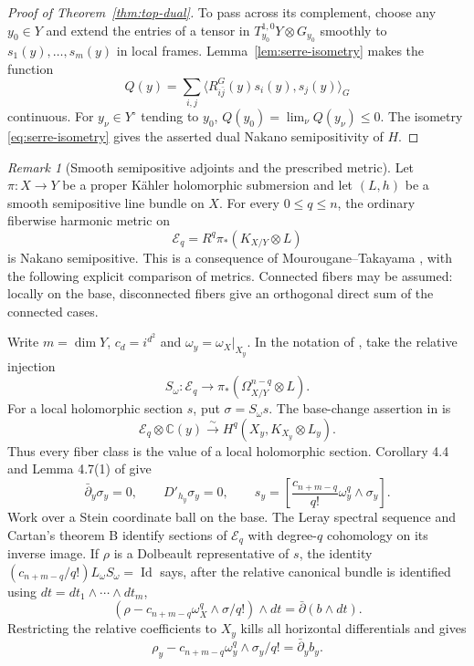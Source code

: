 \documentclass[11pt,reqno]{amsart}
\numberwithin{equation}{section}
\theoremstyle{definition}
\theoremstyle{remark}
\newtheorem{remark}[theorem]{Remark}
\newcommand{\Id}{\operatorname{Id}}
\begin{document}
\begin{proof}[Proof of Theorem~\ref{thm:top-dual}]
To pass across its complement, choose any $y_0\in Y$ and extend
the entries of a tensor in $T_{y_0}^{1,0}Y\otimes G_{y_0}$ smoothly
to $s_1(y),\ldots,s_m(y)$ in local frames.  Lemma~\ref{lem:serre-isometry}
makes the function
\[
 Q(y)=\sum_{i,j}\langle R^G_{i\bar j}(y)s_i(y),s_j(y)\rangle_G
\]
continuous.  For $y_\nu\in Y^\circ$ tending to $y_0$,
$Q(y_0)=\lim_\nu Q(y_\nu)\le0$.
The isometry \eqref{eq:serre-isometry} gives the asserted dual
Nakano semipositivity of $H$.
\end{proof}

\begin{remark}[Smooth semipositive adjoints and the prescribed metric]
\label{rem:mt-comparison}
Let $\pi:X\to Y$ be a proper K\"ahler holomorphic submersion and
let $(L,h)$ be a smooth semipositive line bundle on $X$.  For every
$0\le q\le n$, the ordinary fiberwise harmonic metric on
\[
 \mathcal E_q=R^q\pi_*(K_{X/Y}\otimes L)
\]
is Nakano semipositive.  This is a consequence of
Mourougane--Takayama \cite[Theorem 1.1]{MT08}, with the following
explicit comparison of metrics.  Connected fibers may be assumed:
locally on the base, disconnected fibers give an orthogonal direct
sum of the connected cases.

Write $m=\dim Y$, $c_d=i^{d^2}$ and
$\omega_y=\omega_X|_{X_y}$.  In the notation of
\cite[Corollary 4.4]{MT08}, take the relative injection
\[
 S_\omega:\mathcal E_q\longrightarrow
        \pi_*(\Omega_{X/Y}^{n-q}\otimes L).
\]
For a local holomorphic section $s$, put $\sigma=S_\omega s$.
The base-change assertion in \cite[Lemma 4.9]{MT08} is
\[
 \mathcal E_q\otimes\mathbb C(y)
    \xrightarrow{\sim}H^q(X_y,K_{X_y}\otimes L_y).
\]
Thus every fiber class is the value of a local holomorphic section.
Corollary 4.4 and Lemma 4.7(1) of \cite{MT08} give
\begin{equation}\label{eq:mt-three-identities}
 \bar\partial_y\sigma_y=0,\qquad
 D'_{h_y}\sigma_y=0,\qquad
 s_y=\left[\frac{c_{n+m-q}}{q!}\omega_y^q\wedge\sigma_y\right].
\end{equation}
Work over a Stein coordinate ball on the base.  The Leray spectral
sequence and Cartan's theorem B identify sections of $\mathcal E_q$
with degree-$q$ cohomology on its inverse image.  If $\rho$ is a
Dolbeault representative of $s$, the identity
$(c_{n+m-q}/q!)L_\omega S_\omega=\Id$ says, after the relative
canonical bundle is identified using $dt=dt_1\wedge\cdots\wedge dt_m$,
\[
 (\rho-c_{n+m-q}\omega_X^q\wedge\sigma/q!)\wedge dt
       =\bar\partial(b\wedge dt).
\]
Restricting the relative coefficients to $X_y$ kills all horizontal
differentials and gives
\[
 \rho_y-c_{n+m-q}\omega_y^q\wedge\sigma_y/q!
      =\bar\partial_y b_y.
\]


\end{remark}
\end{document}
